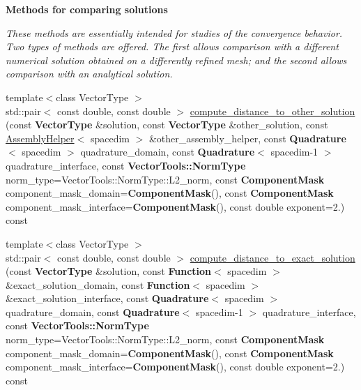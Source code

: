 \begin{Indent}{\bf Methods for comparing solutions}\par
{\em These methods are essentially intended for studies of the convergence behavior. Two types of methods are offered. The first allows comparison with a different numerical solution obtained on a differently refined mesh; and the second allows comparison with an analytical solution. }\begin{DoxyCompactItemize}
\item 
{\footnotesize template$<$class Vector\+Type $>$ }\\std\+::pair$<$ const double, const double $>$ \hyperlink{class_assembly_helper_ac7860831588d35d05009474f2a695e14}{compute\+\_\+distance\+\_\+to\+\_\+other\+\_\+solution} (const {\bf Vector\+Type} \&solution, const {\bf Vector\+Type} \&other\+\_\+solution, const \hyperlink{class_assembly_helper}{Assembly\+Helper}$<$ spacedim $>$ \&other\+\_\+assembly\+\_\+helper, const {\bf Quadrature}$<$ spacedim $>$ quadrature\+\_\+domain, const {\bf Quadrature}$<$ spacedim-\/1 $>$ quadrature\+\_\+interface, const {\bf Vector\+Tools\+::\+Norm\+Type} norm\+\_\+type=Vector\+Tools\+::\+Norm\+Type\+::\+L2\+\_\+norm, const {\bf Component\+Mask} component\+\_\+mask\+\_\+domain={\bf Component\+Mask}(), const {\bf Component\+Mask} component\+\_\+mask\+\_\+interface={\bf Component\+Mask}(), const double exponent=2.) const 
\item 
{\footnotesize template$<$class Vector\+Type $>$ }\\std\+::pair$<$ const double, const double $>$ \hyperlink{class_assembly_helper_aca82c19b1abbc316d0bc563e04db727c}{compute\+\_\+distance\+\_\+to\+\_\+exact\+\_\+solution} (const {\bf Vector\+Type} \&solution, const {\bf Function}$<$ spacedim $>$ \&exact\+\_\+solution\+\_\+domain, const {\bf Function}$<$ spacedim $>$ \&exact\+\_\+solution\+\_\+interface, const {\bf Quadrature}$<$ spacedim $>$ quadrature\+\_\+domain, const {\bf Quadrature}$<$ spacedim-\/1 $>$ quadrature\+\_\+interface, const {\bf Vector\+Tools\+::\+Norm\+Type} norm\+\_\+type=Vector\+Tools\+::\+Norm\+Type\+::\+L2\+\_\+norm, const {\bf Component\+Mask} component\+\_\+mask\+\_\+domain={\bf Component\+Mask}(), const {\bf Component\+Mask} component\+\_\+mask\+\_\+interface={\bf Component\+Mask}(), const double exponent=2.) const 
\end{DoxyCompactItemize}
\end{Indent}
